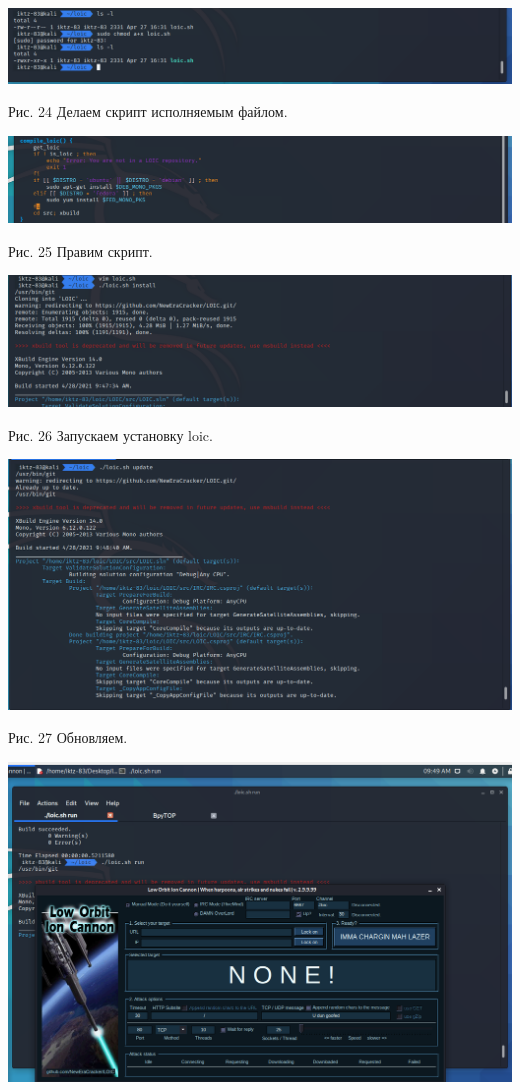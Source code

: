 \documentclass[a4paper,14pt]{extarticle}
\begin{document}
\begin{center}
        \includegraphics[scale=0.4]{pics/24.png}

        Рис. 24 Делаем скрипт исполняемым файлом.
        \vspace{1ex}

        \includegraphics[scale=0.4]{pics/25.png}

        Рис. 25 Правим скрипт.
        \vspace{1ex}

        \includegraphics[scale=0.4]{pics/26.png}

        Рис. 26 Запускаем установку loic.
        \vspace{1ex}

        \includegraphics[scale=0.4]{pics/27.png}

        Рис. 27 Обновляем.
        \vspace{1ex}

        \includegraphics[scale=0.35]{pics/28.png}


\end{center}
\end{document}
